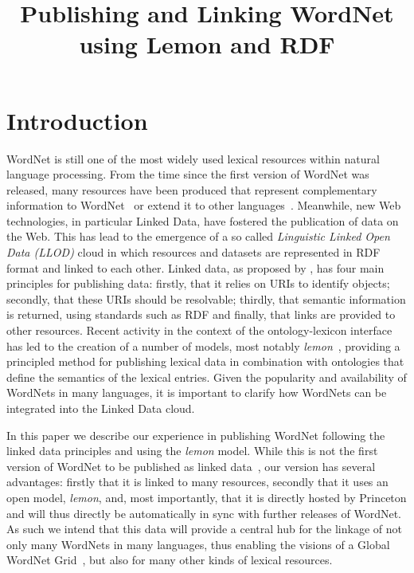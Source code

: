 \documentclass[10pt, a4paper]{article}
\title{Publishing and Linking WordNet using Lemon and RDF}
\newcommand{\lemon}[0]{\emph{lemon}}
\begin{document}
\maketitleabstract

\section{Introduction}

WordNet is still one of the most widely used lexical resources within natural 
language processing. From the time since the first version of WordNet was released, many
resources have been produced that represent complementary information to WordNet~\cite{schuler2005verbnet,baker1998berkeley}
or extend it to other languages~\cite{vossen1998eurowordnet,bond2013linking}. 
Meanwhile, new Web technologies, in particular Linked Data, have fostered the publication of data on the Web.
This has lead to the emergence of a so called \emph{Linguistic Linked Open Data (LLOD)} cloud in which resources and datasets are represented in RDF format and linked to each other.
Linked data, as proposed by \cite{berners2011linked}, has four
main principles for publishing data: firstly, that it relies on URIs to identify
objects; secondly, that these URIs should be resolvable; thirdly, that semantic
information is returned, using standards such as RDF and finally, that links are
provided to other resources. 
Recent activity in the context of the ontology-lexicon interface has
led to the creation of a number of models, most notably
\lemon{}~\cite{mccrae2012interchanging}, providing a principled method for publishing lexical data in combination with ontologies that define the semantics of the lexical entries.
Given the popularity and availability of WordNets in
many languages, it is important to clarify how WordNets can be integrated into the Linked Data cloud.

In this paper we describe our experience
in publishing WordNet following the linked data principles and using the \lemon{} model. While this is not
the first version of WordNet to be published as linked data~\cite{van2006conversion,mccrae2012integrating,graves2006data}, our 
version has several advantages: firstly that it is linked to many
resources, secondly that it uses an open model, \emph{lemon}, and, most importantly, that 
it is directly hosted by Princeton and will thus directly be automatically in sync with further releases of WordNet. 
As such we intend that this data will provide a central hub for the linkage of
not only many WordNets in many languages, thus enabling the visions of a Global
WordNet Grid~\cite{pease2008building}, but also for many other kinds of lexical resources. 
\end{document}
